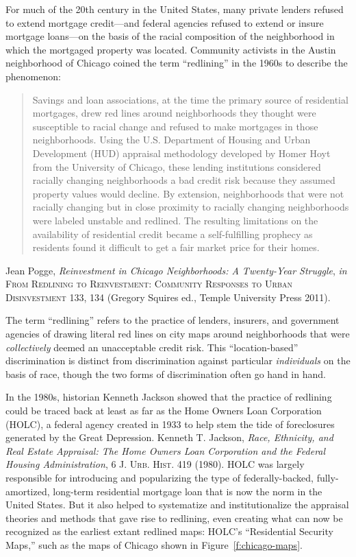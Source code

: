 For much of the 20th century in the United States, many
private lenders refused to extend mortgage credit---and federal agencies
refused to extend or insure mortgage loans---on the basis of the racial
composition of the neighborhood in which the mortgaged property was located.
Community activists in the Austin neighborhood of Chicago coined the term
``redlining'' in the 1960s to describe the phenomenon:
\begin{quote}
Savings and loan associations, at the time the primary source of residential
mortgages, drew red lines around neighborhoods they thought were susceptible to
racial change and refused to make mortgages in those neighborhoods. Using the
U.S. Department of Housing and Urban Development (HUD) appraisal methodology
developed by Homer Hoyt from the University of Chicago, these lending
institutions considered racially changing neighborhoods a bad credit risk
because they assumed property values would decline. By extension, neighborhoods
that were not racially changing but in close proximity to racially changing
neighborhoods were labeled unstable and redlined. The resulting limitations on
the availability of residential credit became a self-fulfilling prophecy as
residents found it difficult to get a fair market price for their homes.
\end{quote}
Jean Pogge, \textit{Reinvestment in Chicago Neighborhoods: A Twenty-Year
Struggle}, \textit{in} \textsc{From Redlining to Reinvestment: Community
Responses to Urban Disinvestment} 133, 134 (Gregory Squires ed., Temple
University Press 2011). 

The term ``redlining'' refers to the practice of lenders, insurers, and
government agencies of drawing literal red lines on city maps around
neighborhoods that were \textit{collectively} deemed an unacceptable credit
risk. This ``location-based'' discrimination is distinct from discrimination
against particular \textit{individuals} on the basis of race, though the two
forms of discrimination often go hand in hand.

In the 1980s, historian Kenneth Jackson showed that the practice of redlining
could be traced back at least as far as the Home Owners Loan Corporation
(HOLC), a federal agency created in 1933 to help stem the tide of foreclosures
generated by the Great Depression. Kenneth T. Jackson, \textit{Race, Ethnicity,
and Real Estate Appraisal: The Home Owners Loan Corporation and the Federal
Housing Administration}, 6 \textsc{J. Urb. Hist.} 419 (1980). HOLC was largely
responsible for introducing and popularizing the type of federally-backed,
fully-amortized, long-term residential mortgage loan that is now the norm in
the United States. But it also helped to systematize and institutionalize the
appraisal theories and methods that gave rise to redlining, even creating what
can now be recognized as the earliest extant redlined maps: HOLC's
``Residential Security Maps,'' such as the maps of Chicago shown in
Figure~\ref{f:chicago-maps}.

